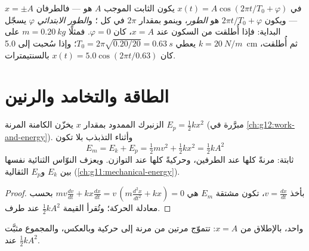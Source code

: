 \begin{definition}\label{def:g12:oscillators-and-time:phase}
في $x(t) = A\cos(2\pi t/T_0 + \varphi)$ يكون الثابت الموجب $A$
هو  --- فالطرفان $x = \pm A$ --- ويكون $2\pi t/T_0 +
\varphi$ هو \emph{الطور}، وينمو بمقدار $2\pi$ في كل
؛ و\emph{الطور الابتدائي} $\varphi$
يسجّل البداية: فإذا أُطلقت من السكون عند $x = A$، كان $\varphi = 0$. فمثلًا
$m = \qty{0.20}{kg}$ على $k = \qty{20}{N/m}$ يعطي $T_0 =
2\pi\sqrt{0.20/20} = \qty{0.63}{s}$؛ وإذا سُحبت إلى \qty{5.0}{cm} ثم
أُطلقت، كان $x(t) = 5.0\cos(2\pi t/0.63)$ بالسنتيمترات.
\end{definition}

\section{الطاقة والتخامد والرنين}

\begin{proposition}\label{prop:g12:oscillators-and-time:energy}
الزنبرك الممدود بمقدار $x$ يخزّن  الكامنة المرنة $E_p =
\tfrac12 kx^2$ (مبرَّرة في \cref{ch:g12:work-and-energy}). وأثناء
التذبذب بلا  تكون 
\[
E_m = E_k + E_p = \tfrac12 m v^2 + \tfrac12 k x^2 = \tfrac12 k A^2
\]
ثابتة: مرنةً كلها عند الطرفين، وحركيةً كلها عند التوازن.
ويعزف النوّاس الثنائية نفسها بين $E_k$ و$E_p$
الثقالية (\cref{ch:g11:mechanical-energy}).
\end{proposition}

\begin{proof}
بأخذ $v = \frac{dx}{dt}$، تكون مشتقة $E_m$ هي $mv\frac{dv}{dt}
+ kx\frac{dx}{dt} = v\,(m\frac{d^2x}{dt^2} + kx) = 0$ بحسب معادلة
الحركة؛ وتُقرأ القيمة $\tfrac12 kA^2$ عند طرف.
\end{proof}

\begin{omfigure}

{\small {} واحد، بالإطلاق من $x = A$: تتموّج  مرتين
من مرنة إلى حركية وبالعكس، والمجموع مثبَّت عند $\tfrac12 kA^2$.}
\end{omfigure}

